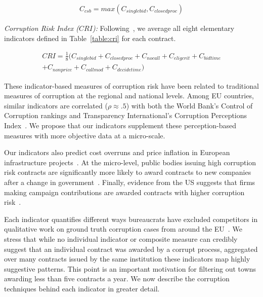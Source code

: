 \begin{align}
C_{csb}=max(C_{singlebid},C_{closedproc})\nonumber
\end{align}

\textit{Corruption Risk Index ($CRI$):} Following~\cite{fazekas2016objective}, we average all eight elementary indicators defined in Table~\ref{table:cri} for each contract.

\begin{align}
CRI = \frac{1}{8} (C_{singlebid}+C_{closedproc}+C_{nocall}+C_{eligcrit}+C_{bidtime}\nonumber\\
+C_{nonprice}+C_{callmod}+C_{decidetime})\nonumber
\end{align}


These indicator-based measures of corruption risk have been related to traditional measures of corruption at the regional and national levels. Among EU countries, similar indicators are correlated ($\rho \approx .5$) with both the World Bank's Control of Corruption rankings and Transparency International's Corruption Perceptions Index~\cite{fazekas2017uncovering}. We propose that our indicators supplement these perception-based measures with more objective data at a micro-scale.

Our indicators also predict cost overruns and price inflation in European infrastructure projects~\cite{fazekas2018extent}. At the micro-level, public bodies issuing high corruption risk contracts are significantly more likely to award contracts to new companies after a change in government~\cite{fazekas2017networks}. Finally, evidence from the US suggests that firms making campaign contributions are awarded contracts with higher corruption risk~\cite{fazekas2018institutional}.

Each indicator quantifies different ways bureaucrats have excluded competitors in qualitative work on ground truth corruption cases from around the EU~\cite{fazekas2016objective}. We stress that while no individual indicator or composite measure can credibly suggest that an individual contract was awarded by a corrupt process, aggregated over many contracts issued by the same institution these indicators map highly suggestive patterns. This point is an important motivation for filtering out towns awarding less than five contracts a year. We now describe the corruption techniques behind each indicator in greater detail.


